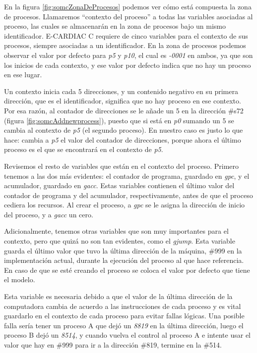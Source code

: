 \documentclass[letterpaper,12pt,oneside]{book}
\begin{document}
			En la figura \ref{fig:somcZonaDeProcesos} podemos ver cómo está compuesta la zona de procesos. Llamaremos ``contexto del proceso'' a todas
			las variables asociadas al proceso, las cuales se almacenarán en la zona de procesos bajo un mismo identificador. E-CARDIAC C requiere
			de cinco variables para el contexto de sus procesos, siempre asociadas a un identificador. En la zona de procesos podemos observar
			el valor por defecto para \textit{p5} y \textit{p10}, el cual es
			\textit{-0001} en ambos, ya que son los 
			inicios de cada contexto, y ese valor por defecto indica que no hay un proceso en ese lugar.
			
			Un contexto inicia cada 5 direcciones, y un contenido negativo en su primera dirección, que es el identificador, significa que no hay 
			proceso en ese
			contexto. Por esa razón, al contador de direcciones se le añade un 5 en la dirección \#s72 (figura \ref{fig:somcAddnewprocess}),
			puesto que si está en \textit{p0} sumando un 5 se cambia al contexto
			de \textit{p5} (el segundo proceso). En nuestro caso es justo lo que hace: cambia a \textit{p5} el valor del contador de direcciones, porque ahora
			el último proceso es el que se encontrará en el contexto de \textit{p5}.
   
            Revisemos el resto de variables que están en el contexto del proceso. Primero tenemos a las dos más evidentes:
            el contador de programa, guardado en \textit{gpc}, y el acumulador, guardado en  \textit{gacc}. Estas variables contienen el último valor
            del contador de programa y del acumulador, respectivamente, antes de que el proceso cediera los recursos. Al crear el proceso, a 
            \textit{gpc} se le asigna la dirección de inicio del proceso, y a \textit{gacc} un cero.
            
             Adicionalmente, tenemos otras variables que 
            son muy importantes para el contexto, pero que quizá no son tan evidentes, como el \textit{gjump}. Esta variable guarda el último valor que 
            tuvo la última dirección de
			la máquina, \#999 en la implementación actual, durante la ejecución del proceso al que hace referencia. En caso de que se esté creando
			el proceso se coloca el valor por defecto que tiene el modelo. 
			
			Esta variable es necesaria debido a que el valor
			de la última dirección de la computadora cambia de acuerdo a las instrucciones de cada proceso y es vital guardarlo en
			el contexto de cada proceso para evitar fallas lógicas. Una posible falla sería tener un proceso A que dejó un \textit{8819} en la 
			última dirección, luego el proceso B dejó un \textit{8514}, y
			cuando vuelva el control al proceso A e intente usar el valor que hay en \#999 para ir a 
            la dirección \#819, termine en la \#514.
   
\end{document}
